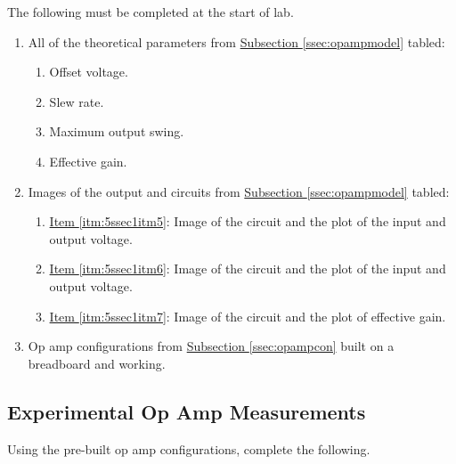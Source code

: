 The following must be completed at the start of lab. 

\begin{enumerate}
	\item All of the theoretical parameters from \hyperref[ssec:opampmodel]{Subsection \ref*{ssec:opampmodel}} tabled:
		\begin{enumerate}
			\item Offset voltage.
			\item Slew rate.
			\item Maximum output swing. 
			\item Effective gain. 
		\end{enumerate}
	\item Images of the output and circuits from \hyperref[ssec:opampmodel]{Subsection \ref*{ssec:opampmodel}} tabled:
		\begin{enumerate}
			\item \hyperref[itm:5ssec1itm5]{Item \ref*{itm:5ssec1itm5}}: Image of the circuit and the plot of the input and output voltage.
			\item \hyperref[itm:5ssec1itm6]{Item \ref*{itm:5ssec1itm6}}: Image of the circuit and the plot of the input and output voltage.
			\item \hyperref[itm:5ssec1itm7]{Item \ref*{itm:5ssec1itm7}}: Image of the circuit and the plot of effective gain.
		\end{enumerate}
	\item Op amp configurations from \hyperref[ssec:opampcon]{Subsection \ref*{ssec:opampcon}} built on a breadboard and working.
\end{enumerate}

\subsection{Experimental Op Amp Measurements}

Using the pre-built op amp configurations, complete the following.

